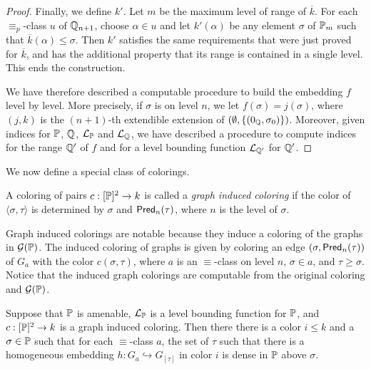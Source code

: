 \begin{proof}
Finally, we define $k'$.
Let $m$ be the maximum level of range of $\overline{k}$.
For each $\equiv_p$-class $u$ of $\mathbb{Q}_{n+1}$,
choose $\alpha\in u$ and let $k'(\alpha)$
be any element $\sigma$ of $\mathbb{P}_{m}$ such that $\overline{k}(\alpha)\leq\sigma$.
Then $k'$ satisfies the same requirements that were
just proved for $\overline{k}$, and has the additional property
that its range is contained in a single level.
This ends the construction.

We have therefore described a computable procedure to build the
embedding $f$ level by level.  More precisely, if $\sigma$ is on level $n$,
we let $f(\sigma)=j(\sigma)$, where $(j,k)$ is the $(n+1)$-th extendible extension
of $(\emptyset,\{(0_{\mathbb{Q}},\sigma_0)\})$.
Moreover, given indices for $\mathbb{P}$, $\mathbb{Q}$, $\mathcal{L}_{\mathbb{P}}$ and $\mathcal{L}_{\mathbb{Q}}$,
we have described a procedure to compute
indices for the range $\mathbb{Q}'$ of $f$
and for a level bounding function $\mathcal{L}_{\mathbb{Q}'}$ for $\mathbb{Q}'$.
\end{proof}

We now define a special class of colorings.

\begin{definition}
A coloring of pairs $c:[\mathbb{P}]^2\to k$ is called a \textit{graph induced coloring}
if the color of $\langle\sigma,\tau\rangle$ is determined by $\sigma$ and $\mathsf{Pred}_n(\tau)$,
where $n$ is the level of $\sigma$.
\end{definition}

Graph induced colorings are notable because they induce a coloring of the graphs in $\mathcal{G}(\mathbb{P})$.
The induced coloring of graphs is given by coloring an edge $(\sigma,\mathsf{Pred}_n(\tau))$ of $G_a$
with the color $c(\sigma,\tau)$,
where $a$ is an $\equiv$-class on level $n$, $\sigma\in a$, and $\tau\geq\sigma$.
Notice that the induced graph colorings are computable from the original coloring and $\mathcal{G}(\mathbb{P})$.

\begin{lem}\label{L:denseAboveSigmaInColorI}
Suppose that $\mathbb{P}$ is amenable, $\mathcal{L}_{\mathbb{P}}$ is a level bounding function for $\mathbb{P}$,
and $c:[\mathbb{P}]^2\to k$ is a graph induced coloring.
Then there there is a color $i\leq k$ and a $\sigma\in\mathbb{P}$ such that for each $\equiv$-class $a$,
the set of $\tau$ such that there is a homogeneous embedding
$h:G_a\hookrightarrow G_{[\tau]}$ in color $i$ is dense in $\mathbb{P}$ above $\sigma$.
\end{lem}

